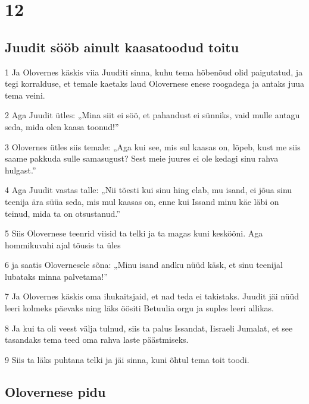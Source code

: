 \chapter{12}

\section*{Juudit sööb ainult kaasatoodud toitu}

\par 1 Ja Olovernes käskis viia Juuditi sinna, kuhu tema hõbenõud olid paigutatud, ja tegi korralduse, et temale kaetaks laud Olovernese enese roogadega ja antaks juua tema veini.
\par 2 Aga Juudit ütles: „Mina siit ei söö, et pahandust ei sünniks, vaid mulle antagu seda, mida olen kaasa toonud!”
\par 3 Olovernes ütles siis temale: „Aga kui see, mis sul kaasas on, lõpeb, kust me siis saame pakkuda sulle samasugust? Sest meie juures ei ole kedagi sinu rahva hulgast.”
\par 4 Aga Juudit vastas talle: „Nii tõesti kui sinu hing elab, mu isand, ei jõua sinu teenija ära süüa seda, mis mul kaasas on, enne kui Issand minu käe läbi on teinud, mida ta on otsustanud.”
\par 5 Siis Olovernese teenrid viisid ta telki ja ta magas kuni keskööni. Aga hommikuvahi ajal tõusis ta üles
\par 6 ja saatis Olovernesele sõna: „Minu isand andku nüüd käsk, et sinu teenijal lubataks minna palvetama!”
\par 7 Ja Olovernes käskis oma ihukaitsjaid, et nad teda ei takistaks. Juudit jäi nüüd leeri kolmeks päevaks ning läks öösiti Betuulia orgu ja suples leeri allikas.
\par 8 Ja kui ta oli veest välja tulnud, siis ta palus Issandat, Iisraeli Jumalat, et see tasandaks tema teed oma rahva laste päästmiseks.
\par 9 Siis ta läks puhtana telki ja jäi sinna, kuni õhtul tema toit toodi.

\section*{Olovernese pidu}

